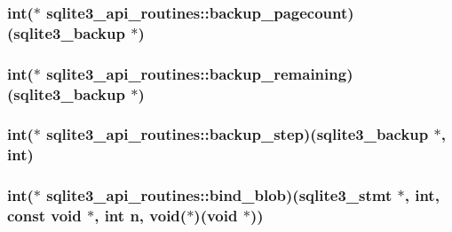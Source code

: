 \hypertarget{structsqlite3__api__routines_ac796f94cb46e331a880131b5dc67e635}{
\subsubsection[{backup\-\_\-pagecount}]{\setlength{\rightskip}{0pt plus 5cm}int($\ast$ sqlite3\-\_\-api\-\_\-routines\-::backup\-\_\-pagecount)({\bf sqlite3\-\_\-backup} $\ast$)}}\label{structsqlite3__api__routines_ac796f94cb46e331a880131b5dc67e635}
\hypertarget{structsqlite3__api__routines_ae376d7dfa771f1c72272b32e2203c6f1}{
\subsubsection[{backup\-\_\-remaining}]{\setlength{\rightskip}{0pt plus 5cm}int($\ast$ sqlite3\-\_\-api\-\_\-routines\-::backup\-\_\-remaining)({\bf sqlite3\-\_\-backup} $\ast$)}}\label{structsqlite3__api__routines_ae376d7dfa771f1c72272b32e2203c6f1}
\hypertarget{structsqlite3__api__routines_a3a8f0bc14589950ee606d5354ff364ed}{
\subsubsection[{backup\-\_\-step}]{\setlength{\rightskip}{0pt plus 5cm}int($\ast$ sqlite3\-\_\-api\-\_\-routines\-::backup\-\_\-step)({\bf sqlite3\-\_\-backup} $\ast$, int)}}\label{structsqlite3__api__routines_a3a8f0bc14589950ee606d5354ff364ed}
\hypertarget{structsqlite3__api__routines_afeb41d70ab5a221fec488560934c825b}{
\subsubsection[{bind\-\_\-blob}]{\setlength{\rightskip}{0pt plus 5cm}int($\ast$ sqlite3\-\_\-api\-\_\-routines\-::bind\-\_\-blob)({\bf sqlite3\-\_\-stmt} $\ast$, int, const void $\ast$, int n, void($\ast$)(void $\ast$))}}\label{structsqlite3__api__routines_afeb41d70ab5a221fec488560934c825b}
